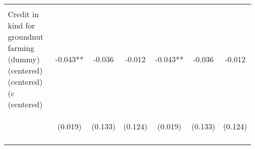 \begin{center}
\begin{tabular}{lcccccc}
\vspace{4pt} & \begin{footnotesize}[0.835]\end{footnotesize} & \begin{footnotesize}[0.427]\end{footnotesize} & \begin{footnotesize}[0.366]\end{footnotesize} & \begin{footnotesize}[0.835]\end{footnotesize} & \begin{footnotesize}[0.427]\end{footnotesize} & \begin{footnotesize}[0.366]\end{footnotesize} \\
Credit in kind for groundnut farming (dummy) (centered) (centered) (c (centered) & -0.043** & -0.036 & -0.012 & -0.043** & -0.036 & -0.012 \\
 & \begin{footnotesize}(0.019)\end{footnotesize} & \begin{footnotesize}(0.133)\end{footnotesize} & \begin{footnotesize}(0.124)\end{footnotesize} & \begin{footnotesize}(0.019)\end{footnotesize} & \begin{footnotesize}(0.133)\end{footnotesize} & \begin{footnotesize}(0.124)\end{footnotesize} \\
\vspace{4pt} & \begin{footnotesize}[0.025]\end{footnotesize} & \begin{footnotesize}[0.784]\end{footnotesize} & \begin{footnotesize}[0.925]\end{footnotesize} & \begin{footnotesize}[0.025]\end{footnotesize} & \begin{footnotesize}[0.784]\end{footnotesize} & \begin{footnotesize}[0.925]\end{footnotesize} \\

\end{tabular}
\end{center}

